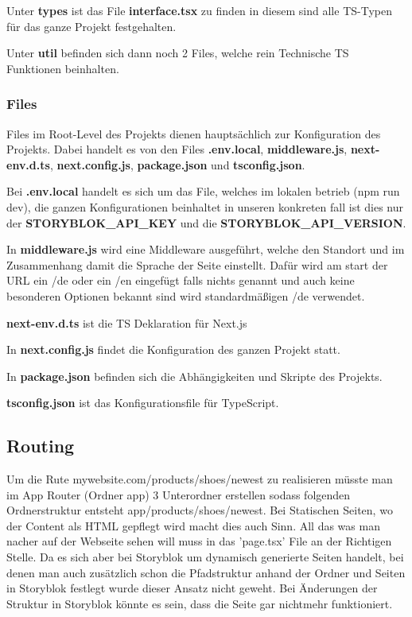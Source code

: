 Unter \textbf{types} ist das File \textbf{interface.tsx} zu finden in diesem sind alle TS-Typen für das ganze Projekt festgehalten.

Unter \textbf{util} befinden sich dann noch 2 Files, welche rein Technische TS Funktionen beinhalten.

\subsubsection*{Files}
Files im Root-Level des Projekts dienen hauptsächlich zur Konfiguration des Projekts. Dabei handelt es von den Files \textbf{.env.local}, \textbf{middleware.js}, \textbf{next-env.d.ts}, \textbf{next.config.js}, \textbf{package.json} und \textbf{tsconfig.json}.

Bei \textbf{.env.local} handelt es sich um das File, welches im lokalen betrieb (npm run dev), die ganzen Konfigurationen beinhaltet in unseren konkreten fall ist dies nur der \textbf{STORYBLOK\_API\_KEY} und die \textbf{STORYBLOK\_API\_VERSION}.

In \textbf{middleware.js} wird eine Middleware ausgeführt, welche den Standort und im Zusammenhang damit die Sprache der Seite einstellt. Dafür wird am start der URL ein /de oder ein /en eingefügt falls nichts genannt und auch keine besonderen Optionen bekannt sind wird standardmäßigen /de verwendet.

\textbf{next-env.d.ts} ist die TS Deklaration für Next.js

In \textbf{next.config.js} findet die Konfiguration des ganzen Projekt statt.

In \textbf{package.json} befinden sich die Abhängigkeiten und Skripte des Projekts.

\textbf{tsconfig.json} ist das Konfigurationsfile für TypeScript.

\subsection{Routing}
Um die Rute mywebsite.com/products/shoes/newest zu realisieren müsste man im App Router (Ordner app) 3 Unterordner erstellen sodass folgenden Ordnerstruktur entsteht app/products/shoes/newest. Bei Statischen Seiten, wo der Content als HTML gepflegt wird macht dies auch Sinn. All das was man nacher auf der Webseite sehen will muss in das 'page.tsx' File an der Richtigen Stelle. 
Da es sich aber bei Storyblok um dynamisch generierte Seiten handelt, bei denen man auch zusätzlich schon die Pfadstruktur anhand der Ordner und Seiten in Storyblok festlegt wurde dieser Ansatz nicht geweht. Bei Änderungen der Struktur in Storyblok könnte es sein, dass die Seite gar nichtmehr funktioniert. 

